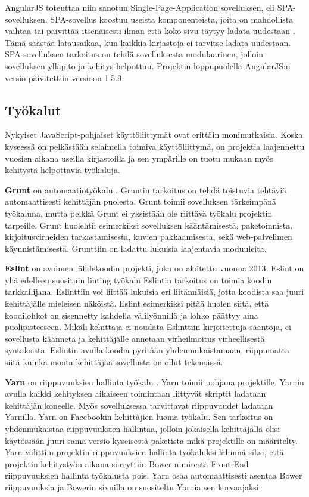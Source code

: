 \documentclass{tktltiki}
\begin{document}
AngularJS toteuttaa niin sanotun Single-Page-Application sovelluksen, eli SPA-sovelluksen. SPA-sovellus koostuu useista komponenteista, joita on mahdollista vaihtaa tai päivittää itsenäisesti ilman että koko sivu täytyy ladata uudestaan \cite{jadhav2015single}. Tämä säästää latausaikaa, kun kaikkia kirjastoja ei tarvitse ladata uudestaan. SPA-sovelluksen tarkoitus on tehdä sovelluksesta modulaarinen, jolloin sovelluksen ylläpito ja kehitys helpottuu. Projektin loppupuolella AngularJS:n versio päivitettiin versioon 1.5.9.

\subsection{Työkalut}

Nykyiset JavaScript-pohjaiset käyttöliittymät ovat erittäin monimutkaisia. Koska kyseessä on pelkästään selaimella toimiva käyttöliittymä, on projektia laajennettu vuosien aikana useilla kirjastoilla ja sen ympärille on tuotu mukaan myös kehitystä helpottavia työkaluja.

\textbf{Grunt} on automaatiotyökalu \cite{cryer2015pro}. Gruntin tarkoitus on tehdä toistuvia tehtäviä automaattisesti kehittäjän puolesta. Grunt toimii sovelluksen tärkeimpänä työkaluna, mutta pelkkä Grunt ei yksistään ole riittävä työkalu projektin tarpeille. Grunt huolehtii esimerkiksi sovelluksen kääntämisestä, paketoinnista, kirjoitusvirheiden tarkastamisesta, kuvien pakkaamisesta, sekä web-palvelimen käynnistämisestä. Grunttiin on ladattu lukuisia laajentavia moduuleita.

\textbf{Eslint} on avoimen lähdekoodin projekti, joka on aloitettu vuonna 2013. Eslint on yhä edelleen suosituin linting työkalu \cite{tomasdottir2018adoption} Eslintin tarkoitus on toimia koodin tarkkailijana. Eslinttiin voi liittää lukuisia eri liitännäisiä, jotta koodista saa juuri kehittäjälle mieleisen näköistä. Eslint esimerkiksi pitää huolen siitä, että koodilohkot on sisennetty kahdella välilyönnillä ja lohko päättyy aina puolipisteeseen. Mikäli kehittäjä ei noudata Eslinttiin kirjoitettuja sääntöjä, ei sovellusta käännetä ja kehittäjälle annetaan virheilmoitus virheellisestä syntaksista. Eslintin avulla koodia pyritään yhdenmukaistamaan, riippumatta siitä kuinka monta kehittäjää sovellusta on ollut tekemässä. 

\textbf{Yarn} on riippuvuuksien hallinta työkalu \cite{McKenzie}. Yarn toimii pohjana projektille. Yarnin avulla kaikki kehityksen aikaiseen toimintaan liittyvät skriptit ladataan kehittäjän koneelle. Myös sovelluksessa tarvittavat riippuvuudet ladataan Yarnilla. Yarn on Facebookin kehittäjien luoma työkalu. Sen tarkoitus on yhdenmukaistaa riippuvuuksien hallintaa, jolloin jokaisella kehittäjällä olisi käytössään juuri sama versio kyseisestä paketista mikä projektille on määritelty. Yarn valittiin projektin riippuvuuksien hallinta työkaluksi lähinnä siksi, että projektin kehitystyön aikana siirryttiin Bower nimisestä Front-End riippuvuuksien hallinta työkalusta pois. Yarn osaa automaattisesti asentaa Bower riippuvuuksia ja Bowerin sivuilla on suositeltu Yarnia sen korvaajaksi.
\end{document}
